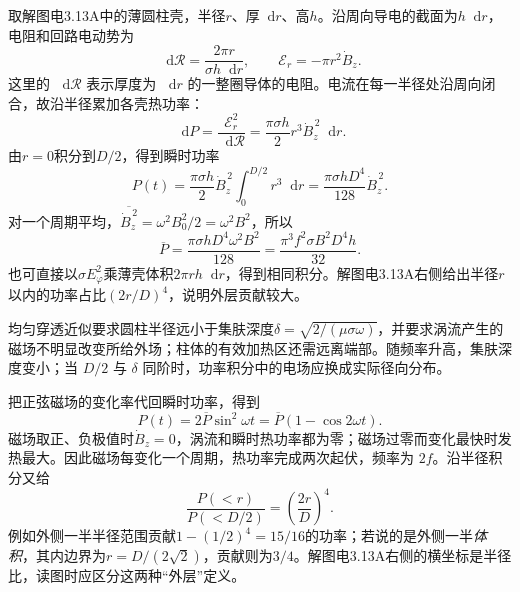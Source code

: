 \documentclass[UTF8,fontset=fandol,a4paper,11pt]{ctexart}
\newcommand{\dd}{\mathop{}\!\mathrm{d}}
\begin{document}
取解图电3.13A中的薄圆柱壳，半径$r$、厚$\dd r$、高$h$。沿周向导电的截面为$h\dd r$，电阻和回路电动势为
\[
\dd\mathcal R=\frac{2\pi r}{\sigma h\dd r},\qquad
\mathcal E_r=-\pi r^2\dot B_z.
\]
这里的 $\dd\mathcal R$ 表示厚度为 $\dd r$ 的一整圈导体的电阻。电流在每一半径处沿周向闭合，故沿半径累加各壳热功率：
\[
\dd P=\frac{\mathcal E_r^2}{\dd\mathcal R}
=\frac{\pi\sigma h}{2}r^3\dot B_z^{\,2}\dd r.
\]
由$r=0$积分到$D/2$，得到瞬时功率
\[
P(t)=\frac{\pi\sigma h}{2}\dot B_z^{\,2}\int_0^{D/2}r^3\dd r
=\frac{\pi\sigma hD^4}{128}\dot B_z^{\,2}.
\]
对一个周期平均，$\overline{\dot B_z^{\,2}}=\omega^2B_0^2/2=\omega^2B^2$，所以
\[
\boxed{\overline P=\frac{\pi\sigma hD^4\omega^2B^2}{128}
=\frac{\pi^3f^2\sigma B^2D^4h}{32}}.
\]
也可直接以$\sigma E_\varphi^2$乘薄壳体积$2\pi rh\dd r$，得到相同积分。解图电3.13A右侧给出半径$r$以内的功率占比$(2r/D)^4$，说明外层贡献较大。

均匀穿透近似要求圆柱半径远小于集肤深度$\delta=\sqrt{2/(\mu\sigma\omega)}$，并要求涡流产生的磁场不明显改变所给外场；柱体的有效加热区还需远离端部。随频率升高，集肤深度变小；当 $D/2$ 与 $\delta$ 同阶时，功率积分中的电场应换成实际径向分布。

把正弦磁场的变化率代回瞬时功率，得到
\[
P(t)=2\overline P\sin^2\omega t
=\overline P(1-\cos2\omega t).
\]
磁场取正、负极值时$\dot B_z=0$，涡流和瞬时热功率都为零；磁场过零而变化最快时发热最大。因此磁场每变化一个周期，热功率完成两次起伏，频率为 $2f$。沿半径积分又给
\[
\frac{P(<r)}{P(<D/2)}=\left(\frac{2r}{D}\right)^4.
\]
例如外侧一半半径范围贡献$1-(1/2)^4=15/16$的功率；若说的是外侧一半\emph{体积}，其内边界为$r=D/(2\sqrt2)$，贡献则为$3/4$。解图电3.13A右侧的横坐标是半径比，读图时应区分这两种“外层”定义。
\end{document}
